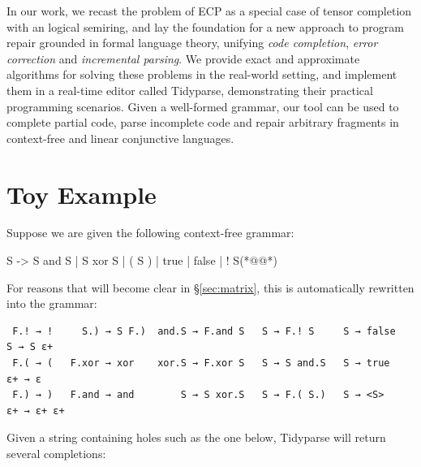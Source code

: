 \documentclass[sigplan,review,anonymous,acmsmall]{acmart}\settopmatter{printfolios=false,printccs=false,printacmref=false}
\begin{document}
In our work, we recast the problem of ECP as a special case of tensor completion with an logical semiring, and lay the foundation for a new approach to program repair grounded in formal language theory, unifying \textit{code completion}, \textit{error correction} and \textit{incremental parsing}. We provide exact and approximate algorithms for solving these problems in the real-world setting, and implement them in a real-time editor called Tidyparse, demonstrating their  practical programming scenarios. Given a well-formed grammar, our tool can be used to complete partial code, parse incomplete code and repair arbitrary fragments in context-free and linear conjunctive languages.

\section{Toy Example}

Suppose we are given the following context-free grammar:

\begin{wholetidyinput}
S -> S and S | S xor S | ( S ) | true | false | ! S(*@\caret{ }@*)
\end{wholetidyinput}

\noindent For reasons that will become clear in \S\ref{sec:matrix}, this is automatically rewritten into the grammar:

\begin{verbatim}
 F.! → !     S.) → S F.)  and.S → F.and S   S → F.! S     S → false    S → S ε+
 F.( → (   F.xor → xor    xor.S → F.xor S   S → S and.S   S → true    ε+ → ε
 F.) → )   F.and → and        S → S xor.S   S → F.( S.)   S → <S>     ε+ → ε+ ε+
\end{verbatim}

%

\noindent Given a string containing holes such as the one below, Tidyparse will return several completions:
\end{document}
